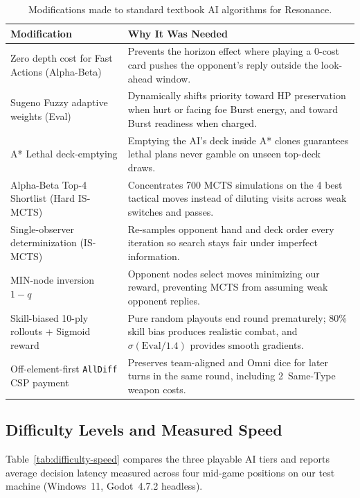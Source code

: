 \documentclass[11pt,a4paper]{article}
\begin{document}
\begin{table}[H]
\centering
\caption{Modifications made to standard textbook AI algorithms for Resonance.}
\label{tab:modifications}
\small
\begin{tabularx}{\textwidth}{@{}L{5.6cm} Y@{}}
\toprule
Modification & Why It Was Needed \\
\midrule
Zero depth cost for Fast Actions (Alpha-Beta) & Prevents the horizon effect where playing a 0-cost card pushes the opponent's reply outside the look-ahead window. \\
Sugeno Fuzzy adaptive weights (Eval) & Dynamically shifts priority toward HP preservation when hurt or facing foe Burst energy, and toward Burst readiness when charged. \\
A* Lethal deck-emptying & Emptying the AI's deck inside A* clones guarantees lethal plans never gamble on unseen top-deck draws. \\
Alpha-Beta Top-4 Shortlist (Hard IS-MCTS) & Concentrates 700 MCTS simulations on the 4 best tactical moves instead of diluting visits across weak switches and passes. \\
Single-observer determinization (IS-MCTS) & Re-samples opponent hand and deck order every iteration so search stays fair under imperfect information. \\
MIN-node inversion $1-q$ & Opponent nodes select moves minimizing our reward, preventing MCTS from assuming weak opponent replies. \\
Skill-biased 10-ply rollouts + Sigmoid reward & Pure random playouts end round prematurely; 80\% skill bias produces realistic combat, and $\sigma(\text{Eval}/1.4)$ provides smooth gradients. \\
Off-element-first \texttt{AllDiff} CSP payment & Preserves team-aligned and Omni dice for later turns in the same round, including 2~Same-Type weapon costs. \\
\bottomrule
\end{tabularx}
\end{table}

\subsection{Difficulty Levels and Measured Speed}

Table~\ref{tab:difficulty-speed} compares the three playable AI tiers and reports average decision latency measured across four mid-game positions on our test machine (Windows~11, Godot~4.7.2 headless).
\end{document}
